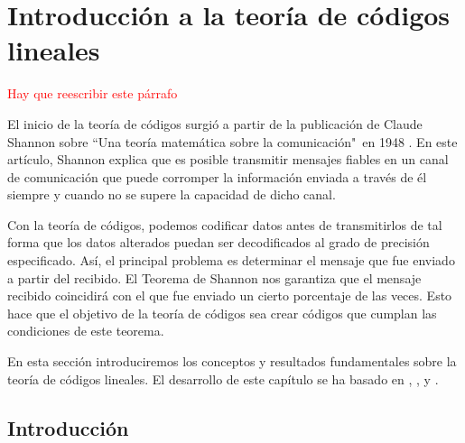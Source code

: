 
\chapter{Introducción a la teoría de códigos lineales}


\textcolor{red}{Hay que reescribir este párrafo}

El inicio de la teoría de códigos surgió a partir de la publicación de Claude Shannon sobre ``Una teoría matemática sobre la comunicación"\ en 1948 \cite{Shannon_1948}. En este artículo, Shannon explica que es posible transmitir mensajes fiables en un canal de comunicación que puede corromper la información enviada a través de él siempre y cuando no se supere la capacidad de dicho canal.

Con la teoría de códigos, podemos codificar datos antes de transmitirlos de tal forma que los datos alterados puedan ser decodificados al grado de precisión especificado. Así, el principal problema es determinar el mensaje que fue enviado a partir del recibido. El Teorema de Shannon nos garantiza que el mensaje recibido coincidirá con el que fue enviado un cierto porcentaje de las veces. Esto hace que el objetivo de la teoría de códigos sea crear códigos que cumplan las condiciones de este teorema.

En esta sección introduciremos los conceptos y resultados fundamentales sobre la teoría de códigos lineales. El desarrollo de este capítulo se ha basado en \cite{Huffman_Pless_2010}, \cite{Vardy_1997}, \cite{Wassermann_2006} y \cite{Podesta_2006}.

\section{Introducción}

